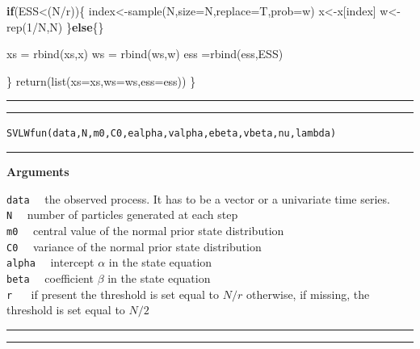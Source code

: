 \documentclass[
]{book}
\newenvironment{Shaded}{\begin{snugshade}}{\end{snugshade}}
\newcommand{\AttributeTok}[1]{\textcolor[rgb]{0.77,0.63,0.00}{#1}}
\newcommand{\ControlFlowTok}[1]{\textcolor[rgb]{0.13,0.29,0.53}{\textbf{#1}}}
\newcommand{\DecValTok}[1]{\textcolor[rgb]{0.00,0.00,0.81}{#1}}
\newcommand{\FunctionTok}[1]{\textcolor[rgb]{0.00,0.00,0.00}{#1}}
\newcommand{\NormalTok}[1]{#1}
\newcommand{\OtherTok}[1]{\textcolor[rgb]{0.56,0.35,0.01}{#1}}
\newcommand{\SpecialCharTok}[1]{\textcolor[rgb]{0.00,0.00,0.00}{#1}}
\theoremstyle{break}
\theoremstyle{nonumberplain}
\begin{document}
\begin{Shaded}
\begin{Highlighting}[]
    \ControlFlowTok{if}\NormalTok{(ESS}\SpecialCharTok{\textless{}}\NormalTok{(N}\SpecialCharTok{/}\NormalTok{r))\{}
\NormalTok{      index}\OtherTok{\textless{}{-}}\FunctionTok{sample}\NormalTok{(N,}\AttributeTok{size=}\NormalTok{N,}\AttributeTok{replace=}\NormalTok{T,}\AttributeTok{prob=}\NormalTok{w)}
\NormalTok{      x}\OtherTok{\textless{}{-}}\NormalTok{x[index]}
\NormalTok{      w}\OtherTok{\textless{}{-}}\FunctionTok{rep}\NormalTok{(}\DecValTok{1}\SpecialCharTok{/}\NormalTok{N,N)}
\NormalTok{    \}}\ControlFlowTok{else}\NormalTok{\{\}}
    
\NormalTok{    xs }\OtherTok{=} \FunctionTok{rbind}\NormalTok{(xs,x)}
\NormalTok{    ws }\OtherTok{=} \FunctionTok{rbind}\NormalTok{(ws,w)}
\NormalTok{    ess }\OtherTok{=}\FunctionTok{rbind}\NormalTok{(ess,ESS)}
    
\NormalTok{  \}}
  \FunctionTok{return}\NormalTok{(}\FunctionTok{list}\NormalTok{(}\AttributeTok{xs=}\NormalTok{xs,}\AttributeTok{ws=}\NormalTok{ws,}\AttributeTok{ess=}\NormalTok{ess))}
\NormalTok{\}}
\end{Highlighting}
\end{Shaded}

\hrule
\hrule

\hfill\break
\texttt{SVLWfun(data,N,m0,C0,ealpha,valpha,ebeta,vbeta,nu,lambda)}\\

\hrule

\textbf{Arguments}

\texttt{data} ~~the observed process. It has to be a vector or a
univariate time series.\\
\texttt{N} ~~number of particles generated at each step\\
\texttt{m0} ~~central value of the normal prior state distribution\\
\texttt{C0} ~~variance of the normal prior state distribution\\
\texttt{alpha} ~~intercept \(\alpha\) in the state equation\\
\texttt{beta} ~~coefficient \(\beta\) in the state equation\\
\texttt{r} ~~ if present the threshold is set equal to \(N/r\)
otherwise, if missing, the threshold is set equal to \(N/2\)

\hrule
\hrule
\end{document}
